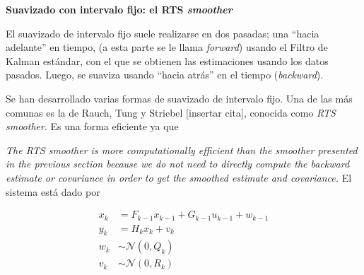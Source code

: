 \noindent \textbf{Suavizado con intervalo fijo: el RTS \textit{smoother}} 



El suavizado de intervalo fijo suele realizarse en dos pasadas; una ``hacia adelante'' en tiempo, (a esta parte se le llama \textit{forward}) usando el Filtro de Kalman estándar, con el que se obtienen las estimaciones usando los datos pasados. Luego, se suaviza usando ``hacia atrás'' en el tiempo (\textit{backward}).

Se han desarrollado varias formas de suavizado de intervalo fijo. Una de las más comunas es la de Rauch, Tung y Striebel [insertar cita], conocida como \textit{RTS smoother}. Es una forma eficiente ya que 

\textit{The RTS smoother is more computationally efficient than the smoother presented in the previous section because we do not need to directly compute the backward estimate or covariance in order to get the smoothed estimate and covariance. }
El sistema está dado por 

\[
\begin{aligned}
x_k &= F_{k-1}x_{k-1} + G_{k-1}u_{k-1} + w_{k-1} \\ 
y_k &= H_k x_k + v_k \\ 
w_k &\sim  \mathcal{N}(0, Q_k)\\
v_k &\sim  \mathcal{N}(0, R_k)
\end{aligned}
\] 

